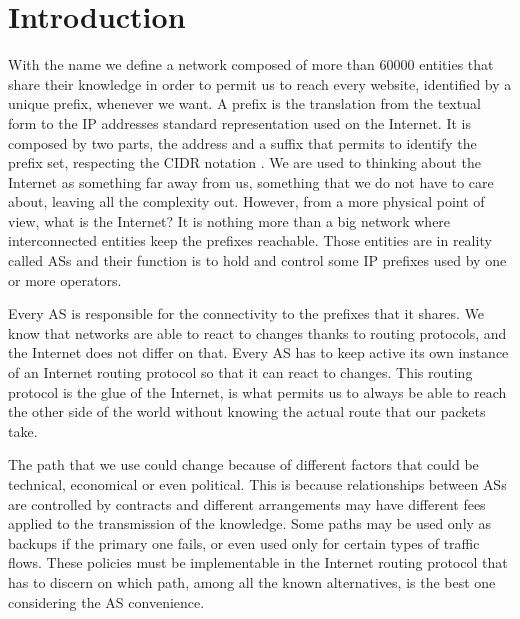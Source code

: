 \chapter{Introduction}
\label{cha:introduction}



With the name  we define a network composed of more than \num{60000}
entities that share their knowledge in order to permit us to reach every website,
identified by a unique prefix, whenever we want.
A prefix is the translation from the textual form to the \ac{IP} addresses
standard representation used on the Internet.
It is composed by two parts, the address and a suffix that permits to identify the
prefix set, respecting the \ac{CIDR} notation \cite{fuller1993classless}.
We are used to thinking about the Internet as something far away from us, something
that we do not have to care about, leaving all the complexity
out.
However, from a more physical point of view, what is the Internet? It is nothing
more than a big network where interconnected entities keep the prefixes reachable.
Those entities are in reality called \acp{AS} and their function is to hold and
control some \ac{IP} prefixes used by one or more operators.

Every \ac{AS} is responsible for the connectivity to the prefixes that it shares.
We know that networks are able to react to changes thanks to routing protocols,
and the Internet does not differ on that.
Every \ac{AS} has to keep active its own instance of an Internet routing protocol
so that it can react to changes.
This routing protocol is the glue of the Internet, is what permits
us to always be able to reach the other side of the world without knowing
the actual route that our packets take.

The path that we use could change because of different factors that could
be technical, economical or even political.
This is because relationships between \acp{AS} are controlled by contracts and different
arrangements may have different fees applied to the transmission of the knowledge.
Some paths may be used only as backups if the primary one fails, or even used
only for certain types of traffic flows.
These policies must be implementable in the Internet routing protocol that has
to discern on which path, among all the known alternatives, is the best one
considering the \ac{AS} convenience.


